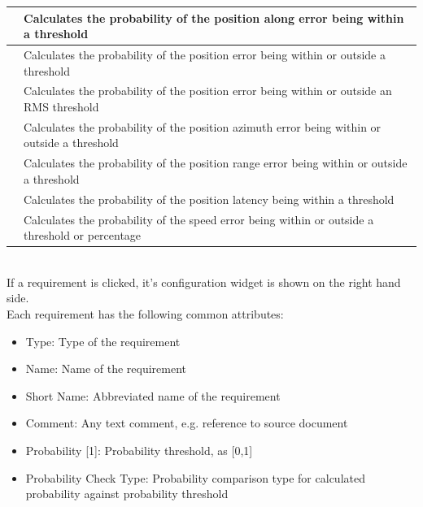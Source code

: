 \begin{center}
\begin{table}[H]
\begin{tabularx}{\textwidth}{ | l | X |  }
    \nameref{sec:eval_req_pos_along} & Calculates the probability of the position along error being within a threshold \\ \hline
    \nameref{sec:eval_req_pos_distance} & Calculates the probability of the position error being within or outside a threshold \\ \hline
    \nameref{sec:eval_req_pos_distance_rms} & Calculates the probability of the position error being within or outside an RMS threshold \\ \hline
    \nameref{sec:eval_req_pos_radar_azm} & Calculates the probability of the position azimuth error being within or outside a threshold \\ \hline
    \nameref{sec:eval_req_pos_radar_rng} & Calculates the probability of the position range error being within or outside a threshold \\ \hline
    \nameref{sec:eval_req_pos_latency}  & Calculates the probability of the position latency being within a threshold \\ \hline
    \nameref{sec:eval_req_speed} & Calculates the probability of the speed error being within or outside a threshold or percentage \\ \hline
\end{tabularx}
\end{table}
\end{center}
\ \\


If a requirement is clicked, it's configuration widget is shown on the right hand side. \\

Each requirement has the following common attributes:
\begin{itemize}  
\item Type: Type of the requirement
\item Name: Name of the requirement
\item Short Name: Abbreviated name of the requirement
\item Comment: Any text comment, e.g. reference to source document
\item Probability [1]: Probability threshold, as [0,1]
\item Probability Check Type: Probability comparison type for calculated probability against probability threshold
\end{itemize}
\ \\

